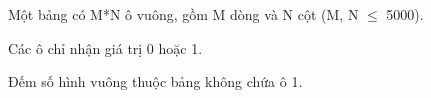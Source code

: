 Một bảng có M*N ô vuông, gồm M dòng và N cột (M, N  $\le$  5000).  

   Các ô chỉ nhận giá trị 0 hoặc 1.  

   Đếm số hình vuông thuộc bảng không chứa ô 1.